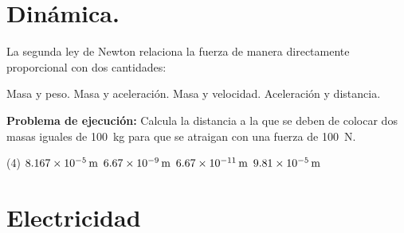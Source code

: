 \documentclass[12pt, letter]{exam}
\begin{document}


\newpage

\begin{questions}
    \section{Dinámica.}

    \question La segunda ley de Newton relaciona la fuerza de manera directamente proporcional con dos cantidades:
    \begin{tasks}
        \task Masa y peso.
        \task Masa y aceleración.
        \task Masa y velocidad.
        \task Aceleración y distancia.
    \end{tasks}
    \question \textbf{Problema de ejecución: } Calcula la distancia a la que se deben de colocar dos masas iguales de \SI{100}{\kilo\gram} para que se atraigan con una fuerza de \SI{100}{\newton}.
    \begin{tasks}(4)
        \task $\SI{8.167d-5}{\meter}$
        \task $\SI{6.67d-9}{\meter}$
        \task $\SI{6.67d-11}{\meter}$
        \task $\SI{9.81d-5}{\meter}$
    \end{tasks}

    \section{Electricidad}


\end{questions}
\end{document}
